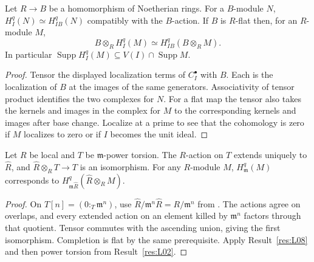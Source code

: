 \begin{proposition}\label{res:L08}
Let \(R\to B\) be a homomorphism of Noetherian rings. For a \(B\)-module
\(N\), \(H_I^q(N)\simeq H_{IB}^q(N)\) compatibly with the \(B\)-action.
If \(B\) is \(R\)-flat then, for an \(R\)-module \(M\),
\[
 B\otimes_R H_I^q(M)\simeq H_{IB}^q(B\otimes_RM).
\]
In particular \(\operatorname{Supp} H_I^q(M)
\subseteq V(I)\cap\operatorname{Supp}M\).
\end{proposition}
\begin{proof}
Tensor the displayed localization terms of \(C_I^\bullet\) with \(B\).
Each is the localization of \(B\) at the images of the same generators.
Associativity of tensor product identifies the two complexes for \(N\).
For a flat map the tensor also takes the kernels and images in the
complex for \(M\) to the corresponding kernels and images after base
change. Localize at a prime to see that the cohomology is zero if \(M\)
localizes to zero or if \(I\) becomes the unit ideal.
\end{proof}

\begin{proposition}\label{res:L09}
Let \(R\) be local and \(T\) be \(\mathfrak m\)-power torsion.
The \(R\)-action on \(T\) extends uniquely to \(\widehat R\), and
\(\widehat R\otimes_R T\to T\) is an isomorphism. For any \(R\)-module
\(M\), \(H^q_{\mathfrak m}(M)\) corresponds to
\(H^q_{\mathfrak m\widehat R}(\widehat R\otimes_RM)\).
\end{proposition}
\begin{proof}
On \(T[n]=(0:_T\mathfrak m^n)\), use
\(\widehat R/\mathfrak m^n\widehat R=R/\mathfrak m^n\)
from \cite[ALG-05-C04-S01]{p103}. The actions agree on overlaps,
and every extended action on an element killed by \(\mathfrak m^n\)
factors through that quotient. Tensor commutes with the ascending
union, giving the first isomorphism. Completion is flat by the same
prerequisite. Apply Result~\ref{res:L08} and then power torsion from
Result~\ref{res:L02}.
\end{proof}

